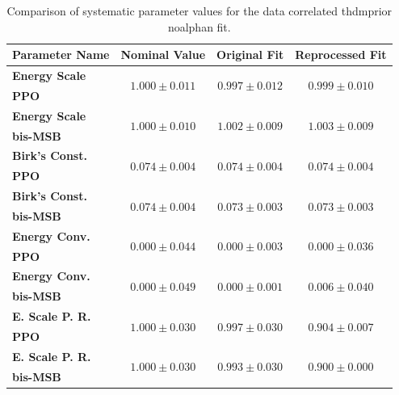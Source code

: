 \begin{table}
    \small
    \centering
    \caption{Comparison of systematic parameter values for the data correlated thdmprior noalphan fit.}
    \label{tab:data_correlated_thdmprior_noalphan_syst_old_new}
    \begin{tabular}{lccc}
        \hline\hline
        \textbf{Parameter Name} & \textbf{Nominal Value} & \textbf{Original Fit} & \textbf{Reprocessed Fit} \\
        \hline

        \textbf{Energy Scale} & \multirow{2}{*}{$1.000\pm0.011$} & \multirow{2}{*}{$0.997\pm0.012$} & \multirow{2}{*}{$0.999\pm0.010$} \\
        \textbf{PPO} & & & \\
        \hline

        \textbf{Energy Scale} & \multirow{2}{*}{$1.000\pm0.010$} & \multirow{2}{*}{$1.002\pm0.009$} & \multirow{2}{*}{$1.003\pm0.009$} \\
        \textbf{bis-MSB} & & & \\
        \hline

        \textbf{Birk's Const.} & \multirow{2}{*}{$0.074\pm0.004$} & \multirow{2}{*}{$0.074\pm0.004$} & \multirow{2}{*}{$0.074\pm0.004$} \\
        \textbf{PPO} & & & \\
        \hline

        \textbf{Birk's Const.} & \multirow{2}{*}{$0.074\pm0.004$} & \multirow{2}{*}{$0.073\pm0.003$} & \multirow{2}{*}{$0.073\pm0.003$} \\
        \textbf{bis-MSB} & & & \\
        \hline

        \textbf{Energy Conv.} & \multirow{2}{*}{$0.000\pm0.044$} & \multirow{2}{*}{$0.000\pm0.003$} & \multirow{2}{*}{$0.000\pm0.036$} \\
        \textbf{PPO} & & & \\
        \hline

        \textbf{Energy Conv.} & \multirow{2}{*}{$0.000\pm0.049$} & \multirow{2}{*}{$0.000\pm0.001$} & \multirow{2}{*}{$0.006\pm0.040$} \\
        \textbf{bis-MSB} & & & \\
        \hline

        \textbf{E. Scale P. R.} & \multirow{2}{*}{$1.000\pm0.030$} & \multirow{2}{*}{$0.997\pm0.030$} & \multirow{2}{*}{$0.904\pm0.007$} \\
        \textbf{PPO} & & & \\
        \hline

        \textbf{E. Scale P. R.} & \multirow{2}{*}{$1.000\pm0.030$} & \multirow{2}{*}{$0.993\pm0.030$} & \multirow{2}{*}{$0.900\pm0.000$} \\
        \textbf{bis-MSB} & & & \\
        \hline

        \hline\hline
    \end{tabular}
\end{table}
